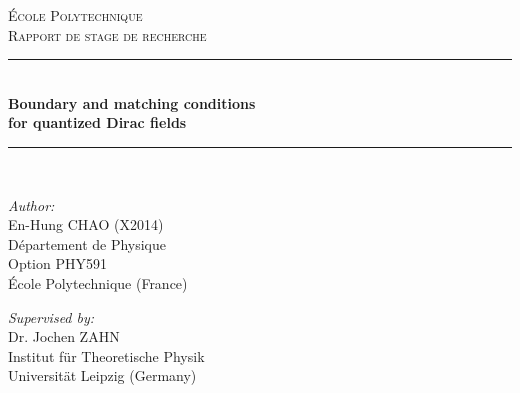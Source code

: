 
\begin{titlepage}

\newcommand{\HRule}{\rule{\linewidth}{0.5mm}} %

\center %
 

\textsc{\LARGE {\'E}cole Polytechnique  }\\[0.3cm] %
\textsc{\Large Rapport de stage de recherche}\\[0.5cm] %


\HRule \\[0.4cm]
{ \huge \bfseries Boundary and matching conditions \\ for quantized Dirac fields}\\[0.03cm] %
\HRule \\[1.5cm]

 

\begin{minipage}{0.4\textwidth}
\begin{flushleft} \large
\emph{Author:}\\
En-Hung CHAO (X2014)  \\D{\'e}partement de Physique\\ Option PHY591 \\ {\'E}cole Polytechnique (France)%
~
\end{flushleft}
\end{minipage}
\begin{minipage}{0.4\textwidth}
\begin{flushright} \large
\emph{Supervised by:} \\
Dr. Jochen ZAHN\\Institut f{\"u}r Theoretische Physik\\Universit{\"a}t Leipzig (Germany) %
\end{flushright}
\end{minipage}\\[1cm]


\end{titlepage}
